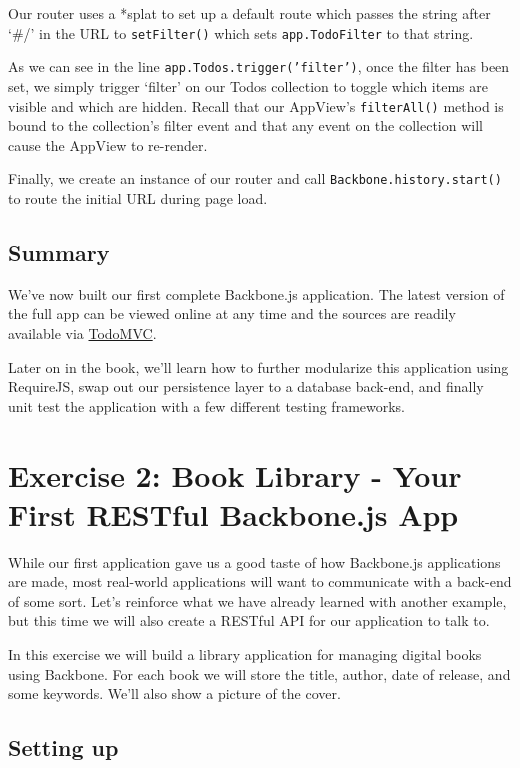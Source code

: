 \documentclass[9pt]{book}
\begin{document}
Our router uses a *splat to set up a default route which passes the
string after `\#/' in the URL to \texttt{setFilter()} which sets
\texttt{app.TodoFilter} to that string.

As we can see in the line \texttt{app.Todos.trigger('filter')}, once the
filter has been set, we simply trigger `filter' on our Todos collection
to toggle which items are visible and which are hidden. Recall that our
AppView's \texttt{filterAll()} method is bound to the collection's
filter event and that any event on the collection will cause the AppView
to re-render.

Finally, we create an instance of our router and call
\texttt{Backbone.history.start()} to route the initial URL during page
load.

\subsection{Summary}\label{summary-2}

We've now built our first complete Backbone.js application. The latest
version of the full app can be viewed online at any time and the sources
are readily available via \href{http://www.todomvc.com}{TodoMVC}.

Later on in the book, we'll learn how to further modularize this
application using RequireJS, swap out our persistence layer to a
database back-end, and finally unit test the application with a few
different testing frameworks.

\section{Exercise 2: Book Library - Your First RESTful Backbone.js
App}\label{exercise-2-book-library---your-first-restful-backbone.js-app}

While our first application gave us a good taste of how Backbone.js
applications are made, most real-world applications will want to
communicate with a back-end of some sort. Let's reinforce what we have
already learned with another example, but this time we will also create
a RESTful API for our application to talk to.

In this exercise we will build a library application for managing
digital books using Backbone. For each book we will store the title,
author, date of release, and some keywords. We'll also show a picture of
the cover.

\subsection{Setting up}\label{setting-up}
\end{document}
